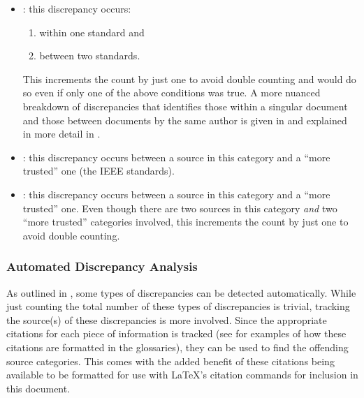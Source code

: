 \begin{itemize}
    \item \textbf{\stds{}}: this discrepancy occurs:
          \begin{enumerate}
              \item within one standard and
              \item between two standards.
          \end{enumerate}
          This increments the count by just one to avoid double counting and
          would do so even if only one of the above conditions was true. A more
          nuanced breakdown of discrepancies that identifies those within a
          singular document and those between documents by the same author is
          given in  and explained in more detail in
          .
    \item \textbf{\metas{}}: this discrepancy occurs between a
          source in this category and a ``more trusted'' one
          (the IEEE standards).
    \item \textbf{\papers{}}: this discrepancy occurs between a
          source in this category and a ``more trusted'' one. Even though there
          are two sources in this category \emph{and} two ``more trusted''
          categories involved, this increments the count by just one to avoid
          double counting.
\end{itemize}

\subsubsection{Automated Discrepancy Analysis}
\label{auto-discrep-analysis}

As outlined in , some types of discrepancies can be detected
automatically. While just counting the total number of these types of
discrepancies is trivial, tracking the source(s) of these discrepancies is more
involved. Since the appropriate citations for each piece of information is
tracked (see  for examples of
how these citations are formatted in the glossaries), they can be used to find
the offending source categories. This comes with the added benefit of these
citations being available to be formatted for use with \LaTeX{}'s citation
commands for inclusion in this document.

